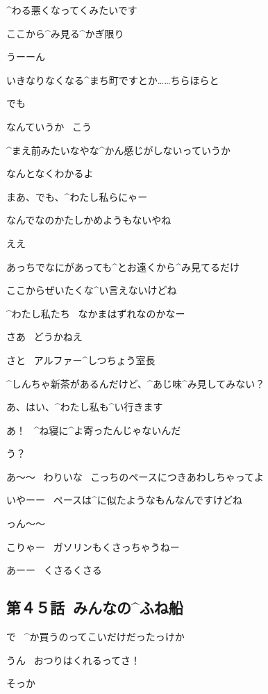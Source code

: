 \ASevenMOne ^{わる}{悪}くなってくみたいです

\ASevenMOne ここから^{み}{見}る^{かぎ}{限}り

\Person うーーん

\page
\ASevenMOne いきなりなくなる^{まち}{町}ですとか……ちらほらと

\ASevenMOne でも

\ASevenMOne なんていうか
\ こう

\ASevenMOne ^{まえ}{前}みたいなやな^{かん}{感}じがしないっていうか

\Person なんとなくわかるよ

\page
\Person まあ、でも、^{わたし}{私}らにゃー

\Person なんでなのかたしかめようもないやね

\ASevenMOne ええ

\ASevenMOne あっちでなにがあっても^{とお}{遠}くから^{み}{見}てるだけ

\Person ここからぜいたくな^{い}{言}えないけどね

\page[20]
\ASevenMOne ^{わたし}{私}たち
\ なかまはずれなのかなー

\Person さあ
\ どうかねえ

\page
\Person さと
\ アルファー^{しつちょう}{室長}

\Person ^{しんちゃ}{新茶}があるんだけど、^{あじ}{味}^{み}{見}してみない？

\ASevenMOne あ、はい、^{わたし}{私}も^{い}{行}きます

\page[23]
\Alpha あ！
\ ^{ね}{寝}に^{よ}{寄}ったんじゃないんだ

\Ojisan う？

\Ojisan あ〜〜
\ わりいな
\ こっちのペースにつきあわしちゃってよ

\Alpha いやーー
\ ペースは^{に}{似}たようなもんなんですけどね

\Alpha っん〜〜

\page
\Alpha こりゃー
\ ガソリンもくさっちゃうねー

\Ojisan あーー
\ くさるくさる


\subsection{第４５話\ みんなの^{ふね}{船}}

\page[26]
\Takahiro で
\ ^{か}{買}うのってこいだけだったっけか

\Makki うん
\ おつりはくれるってさ！

\page
\Takahiro そっか

